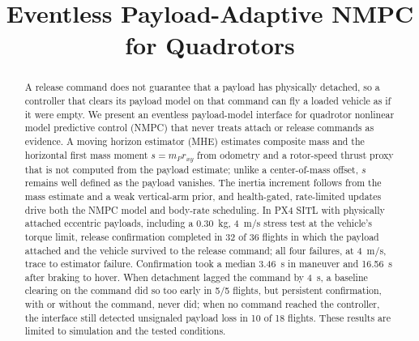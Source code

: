\documentclass[conference]{IEEEtran}
\begin{document}
\title{Eventless Payload-Adaptive NMPC for Quadrotors}

\author{
}

\maketitle

\begin{abstract}
A release command does not guarantee that a payload has physically detached, so a controller
that clears its payload model on that command can fly a loaded vehicle as if it were empty. We
present an eventless payload-model interface for quadrotor nonlinear model predictive control
(NMPC) that never treats attach or release commands as evidence. A moving horizon estimator
(MHE) \cite{rao2003} estimates composite mass and the horizontal first mass moment
$s=m_P r_{xy}$ from odometry and a rotor-speed thrust proxy that is not computed from the
payload estimate; unlike a center-of-mass offset, $s$ remains well defined as the payload
vanishes. The inertia increment follows from the mass estimate and a weak vertical-arm prior,
and health-gated, rate-limited updates drive both the NMPC model and body-rate scheduling. In
PX4 \cite{px4} SITL with physically attached eccentric payloads, including a \SI{0.30}{kg},
\SI{4}{m/s} stress test at the vehicle's torque limit, release confirmation completed in 32 of
36 flights in which the payload attached and the vehicle survived to the release command; all
four failures, at \SI{4}{m/s}, trace to estimator failure. Confirmation took a median
\SI{3.46}{s} in maneuver and \SI{16.56}{s} after braking to hover. When detachment lagged the command by \SI{4}{s},
a baseline clearing on the command did so too early in 5/5 flights, but persistent confirmation,
with or without the command, never did; when no command reached the controller, the interface still detected
unsignaled payload loss in 10 of 18 flights. These results are limited to simulation
and the tested conditions.
\end{abstract}
\end{document}
